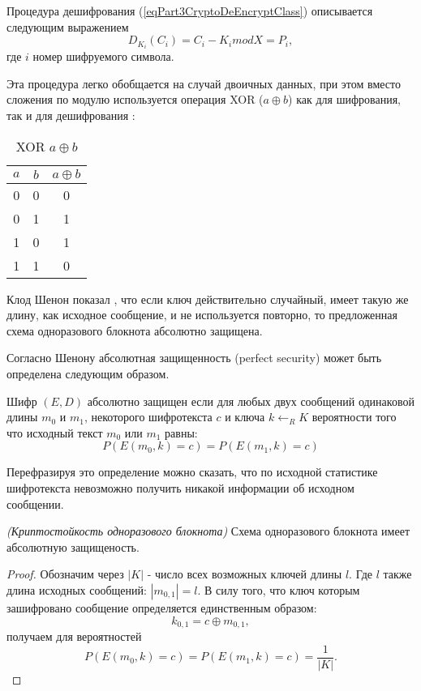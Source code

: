 Процедура дешифрования (\ref{eqPart3CryptoDeEncryptClass}) описывается
следующим выражением
\begin{equation}
D_{K_i}\left(C_i\right) = C_i - K_i mod X = P_i,
\label{eqPart3CryptoDeEncryptVernam}
\end{equation}
где $i$ номер шифруемого символа.

Эта процедура легко обобщается на случай двоичных данных, при этом
вместо сложения по модулю используется операция XOR ($a \oplus b$) как
для шифрования, так и для дешифрования :
\begin{table}
\centering
\begin{tabular}{|c|c|c|}
\hline
$a$ & $b$ & $a \oplus b$ \\ \hline
0  & 0 & 0 \\
0  & 1 & 1 \\
1  & 0 & 1 \\
1  & 1 & 0 \\ \hline
\end{tabular}
\caption{XOR $a \oplus b$}
\label{tblXOR}
\end{table}

Клод Шенон показал \cite{bShenonCrypto}, что если ключ действительно
случайный, имеет такую 
же длину, как исходное сообщение, и не используется повторно, то
предложенная 
схема одноразового блокнота абсолютно защищена.

Согласно Шенону абсолютная защищенность (perfect security) может быть
определена следующим образом.
\begin{definition}
Шифр $\left(E, D\right)$ абсолютно защищен если для любых двух
сообщений одинаковой длины $m_0$ и $m_1$, некоторого шифротекста $c$ и
ключа $k \leftarrow_R K$ вероятности того что исходный текст $m_0$ или
$m_1$ равны:
\begin{equation}
P\left(E\left(m_0, k\right) = c \right) = 
P\left(E\left(m_1, k\right) = c \right)
\nonumber
\end{equation}
\end{definition}
Перефразируя это определение можно сказать, что по исходной статистике
шифротекста невозможно получить никакой информации об исходном
сообщении. 

\begin{theorem}
\emph{(Криптостойкость одноразового блокнота)}
Схема одноразового блокнота имеет абсолютную защищеность.
\end{theorem}

\begin{proof}
Обозначим через $\left|K\right|$ - число всех возможных ключей длины
$l$. Где $l$ также длина исходных сообщений: $\left|m_{0,1}\right| =
l$. В силу того, что ключ которым зашифровано сообщение определяется
единственным образом:
\begin{equation}
k_{0,1} = c \oplus m_{0,1},
\nonumber
\end{equation} 
получаем для вероятностей
\begin{equation}
P\left(E\left(m_0, k\right) = c \right) = 
P\left(E\left(m_1, k\right) = c \right) = 
\frac{1}{\left|K\right|}.
\nonumber
\end{equation}
\end{proof}


